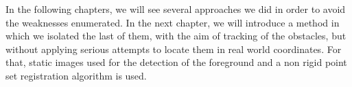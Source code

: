 In the following chapters, we will see several approaches we did in order to avoid the weaknesses enumerated. In the next chapter, we will introduce a method in which we isolated the last of them, with the aim of tracking of the obstacles, but without applying serious attempts to locate them in real world coordinates. For that, static images used for the detection of the foreground and a non rigid point set registration algorithm is used.
























